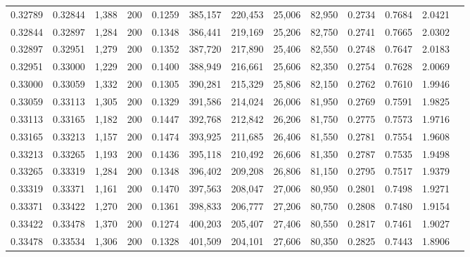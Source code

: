 \begin{tabular}{rrrrrrrrrrrrr}
0.32789 & 0.32844 &  1,388 & 200 &                                     0.1259 & 385,157 & 220,453 &  25,006 &  82,950 & 0.2734 & 0.7684 & 2.0421 \\
0.32844 & 0.32897 &  1,284 & 200 &                                     0.1348 & 386,441 & 219,169 &  25,206 &  82,750 & 0.2741 & 0.7665 & 2.0302 \\
0.32897 & 0.32951 &  1,279 & 200 &                                     0.1352 & 387,720 & 217,890 &  25,406 &  82,550 & 0.2748 & 0.7647 & 2.0183 \\
0.32951 & 0.33000 &  1,229 & 200 &                                     0.1400 & 388,949 & 216,661 &  25,606 &  82,350 & 0.2754 & 0.7628 & 2.0069 \\
0.33000 & 0.33059 &  1,332 & 200 &                                     0.1305 & 390,281 & 215,329 &  25,806 &  82,150 & 0.2762 & 0.7610 & 1.9946 \\
0.33059 & 0.33113 &  1,305 & 200 &                                     0.1329 & 391,586 & 214,024 &  26,006 &  81,950 & 0.2769 & 0.7591 & 1.9825 \\
0.33113 & 0.33165 &  1,182 & 200 &                                     0.1447 & 392,768 & 212,842 &  26,206 &  81,750 & 0.2775 & 0.7573 & 1.9716 \\
0.33165 & 0.33213 &  1,157 & 200 &                                     0.1474 & 393,925 & 211,685 &  26,406 &  81,550 & 0.2781 & 0.7554 & 1.9608 \\
0.33213 & 0.33265 &  1,193 & 200 &                                     0.1436 & 395,118 & 210,492 &  26,606 &  81,350 & 0.2787 & 0.7535 & 1.9498 \\
0.33265 & 0.33319 &  1,284 & 200 &                                     0.1348 & 396,402 & 209,208 &  26,806 &  81,150 & 0.2795 & 0.7517 & 1.9379 \\
0.33319 & 0.33371 &  1,161 & 200 &                                     0.1470 & 397,563 & 208,047 &  27,006 &  80,950 & 0.2801 & 0.7498 & 1.9271 \\
0.33371 & 0.33422 &  1,270 & 200 &                                     0.1361 & 398,833 & 206,777 &  27,206 &  80,750 & 0.2808 & 0.7480 & 1.9154 \\
0.33422 & 0.33478 &  1,370 & 200 &                                     0.1274 & 400,203 & 205,407 &  27,406 &  80,550 & 0.2817 & 0.7461 & 1.9027 \\
0.33478 & 0.33534 &  1,306 & 200 &                                     0.1328 & 401,509 & 204,101 &  27,606 &  80,350 & 0.2825 & 0.7443 & 1.8906 \\

\end{tabular}
